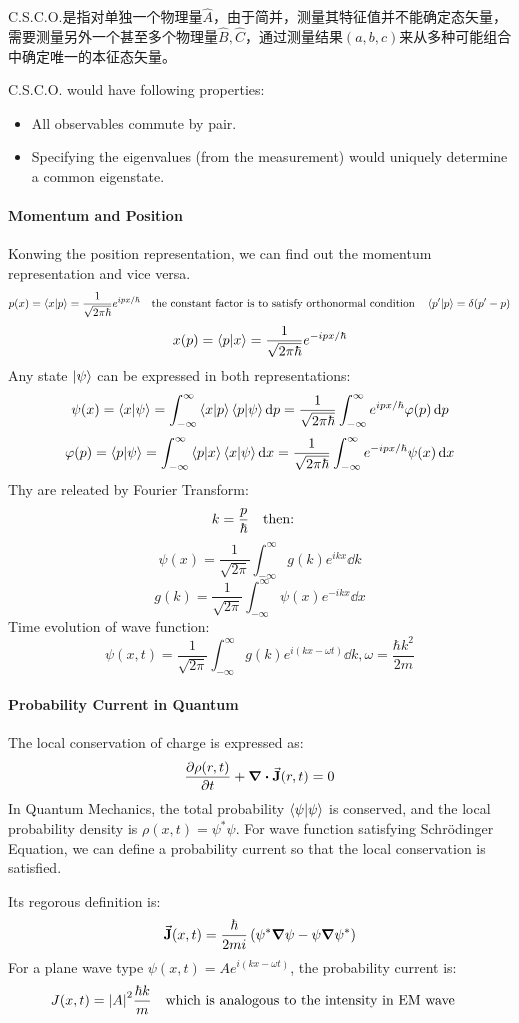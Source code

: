 \documentclass[a4paper,10pt]{article}
\begin{document}
C.S.C.O.是指对单独一个物理量$\hat{A}$，由于简并，测量其特征值并不能确定态矢量，需要测量另外一个甚至多个物理量$\hat{B},\hat{C}$，通过测量结果$(a,b,c)$来从多种可能组合中确定唯一的本征态矢量。

C.S.C.O. would have following properties:
\begin{itemize}
    \item All observables commute by pair.
    \item Specifying the eigenvalues (from the measurement) would uniquely determine a common eigenstate.
\end{itemize}
\paragraph{Momentum and Position}
Konwing the position representation, we can find out the momentum representation and vice versa.
$$p(x)=\bra{x}\ket{p}=\frac{1}{\sqrt{2\pi\hbar}}e^{ipx/\hbar}\qq{the constant factor is to satisfy orthonormal condition}\bra{p^\prime}\ket{p}=\delta(p^\prime-p)$$
$$x(p)=\bra{p}\ket{x}=\frac{1}{\sqrt{2\pi\hbar}}e^{-ipx/\hbar}$$
Any state $\ket{\psi}$ can be expressed in both representations:
$$\psi(x)=\bra{x}\ket{\psi}=\int_{-\infty}^{\infty}\bra{x}\ket{p}\bra{p}\ket{\psi}\dd{p}=\frac{1}{\sqrt{2\pi\hbar}}\int_{-\infty}^{\infty}e^{ipx/\hbar}\varphi(p)\dd{p}$$
$$\varphi(p)=\bra{p}\ket{\psi}=\int_{-\infty}^{\infty}\bra{p}\ket{x}\bra{x}\ket{\psi}\dd{x}=\frac{1}{\sqrt{2\pi\hbar}}\int_{-\infty}^{\infty}e^{-ipx/\hbar}\psi(x)\dd{x}$$
Thy are releated by Fourier Transform:
$$k=\frac{p}{\hbar}\qq{then:}$$
$$\psi(x)=\frac{1}{\sqrt{2\pi}}\int_{-\infty}^{\infty}g(k)e^{ikx}\dd{k}$$
$$g(k)=\frac{1}{\sqrt{2\pi}}\int_{-\infty}^{\infty}\psi(x)e^{-ikx}\dd{x}$$
Time evolution of wave function:
$$\psi(x,t)=\frac{1}{\sqrt{2\pi}}\int_{-\infty}^{\infty}g(k)e^{i(kx-\omega t)}\dd{k},\omega=\frac{\hbar k^2}{2m}$$
\paragraph{Probability Current in Quantum}
The local conservation of charge is expressed as:
$$\pdv{\rho(r,t)}{t}+\div\va{J}(r,t)=0$$
In Quantum Mechanics, the total probability $\bra{\psi}\ket{\psi}$ is conserved, and the local probability density is $\rho(x,t)=\psi^\ast\psi$.
For wave function satisfying Schrödinger Equation, we can define a probability current so that the local conservation is satisfied.

Its regorous definition is:
$$\va{J}(x,t)=\frac{\hbar}{2mi}\left(\psi^\ast\grad\psi-\psi\grad\psi^\ast\right)$$
For a plane wave type $\psi(x,t)=Ae^{i(kx-\omega t)}$, the probability current is:
$$J(x,t)=\abs{A}^2\frac{\hbar k}{m}\qq{which is analogous to the intensity in EM wave}$$
\end{document}
